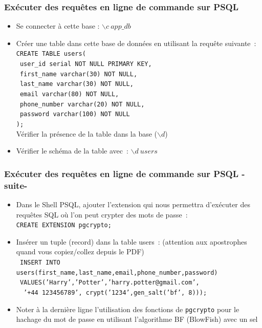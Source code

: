 \documentclass[aspectratio=169,10pt]{beamer}
\begin{document}
\begin{frame}%
	\frametitle{Exécuter des requêtes en ligne de commande sur PSQL}
	\begin{itemize}
		
		\item Se connecter à cette base :  $\backslash c~app\_db$
		\item Créer une table dans cette base de données en utilisant la requête suivante~:\\
		{\footnotesize
\texttt{CREATE TABLE users(\\
 ~user\_id serial NOT NULL PRIMARY KEY,\\
 ~first\_name varchar(30) NOT NULL,\\
 ~last\_name varchar(30) NOT NULL,\\
 ~email varchar(80) NOT NULL,\\
 ~phone\_number varchar(20) NOT NULL,\\
 ~password varchar(100) NOT NULL\\
);}\\}
Vérifier la présence de la table dans la base ($\backslash d$)
\item Vérifier le schéma de la table avec~: \texttt{$\backslash d~users$}
\end{itemize}

\end{frame}	

\begin{frame}
\frametitle{Exécuter des requêtes en ligne de commande sur PSQL -suite-}
	\begin{itemize}
		
		\item Dans le Shell PSQL, ajouter l'extension qui nous permettra d'exécuter des requêtes SQL où l'on peut crypter des mots de passe~:\\
\texttt{CREATE EXTENSION pgcrypto;	}

		
		\item Insérer un tuple (record) dans la table users~: (attention aux apostrophes quand vous copiez/collez depuis le PDF)\\
		{\footnotesize 
			\texttt{
				INSERT INTO users(first\_name,last\_name,email,phone\_number,password) \\
				~VALUES('Harry','Potter','harry.potter@gmail.com',\\~~'+44 123456789',
				crypt('1234',gen\_salt('bf', 8)));
			}
		}
		\item[] Noter à la dernière ligne l'utilisation des fonctions de \texttt{pgcrypto} pour le hachage du mot de passe en utilisant l'algorithme BF (BlowFish) avec un sel
\end{itemize}
\end{frame}	
\end{document}

